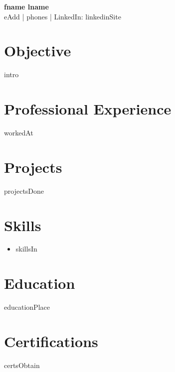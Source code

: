 \documentclass[a4paper,10pt]{article}
\begin{document}
\pagestyle{empty}

\begin{center}
    \textbf{\LARGE {fname} {lname}} \\
    {eAdd} | {phones} | LinkedIn: {linkedinSite}
\end{center}

\section*{Objective}
{intro}

\section*{Professional Experience}
{workedAt}

\section*{Projects}
{projectsDone}

\section*{Skills}
\begin{itemize}
\item{skillsIn}
\end{itemize}

\section*{Education}
{educationPlace}

\section*{Certifications}
{certsObtain}
\end{document}
